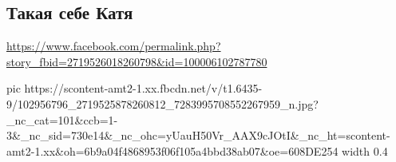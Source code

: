  
 
 
 
 

\subsection{Такая себе Катя}
\label{sec:07_06_2020.fb.zharkih_denis.1.katja}
\url{https://www.facebook.com/permalink.php?story_fbid=2719526018260798&id=100006102787780}


\ifcmt
  pic https://scontent-amt2-1.xx.fbcdn.net/v/t1.6435-9/102956796_2719525878260812_7283995708552267959_n.jpg?_nc_cat=101&ccb=1-3&_nc_sid=730e14&_nc_ohc=yUauH50Vr_AAX9cJOtI&_nc_ht=scontent-amt2-1.xx&oh=6b9a04f4868953f06f105a4bbd38ab07&oe=608DE254
  width 0.4
\fi

